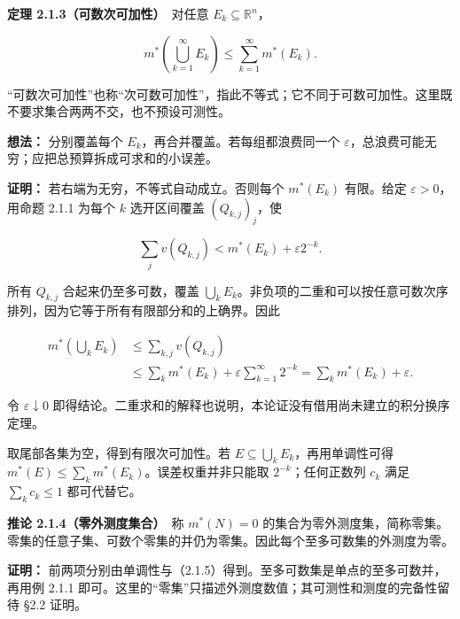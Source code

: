 \documentclass[11pt,a4paper]{article}
\begin{document}
\textbf{定理 2.1.3（可数次可加性）}　对任意
\(E_k\subseteq\mathbb R^n\)，

\begin{equation*}
m^*\left(\bigcup_{k=1}^{\infty}E_k\right)\le\sum_{k=1}^{\infty}m^*(E_k).
\tag{2.1.5}
\end{equation*}

``可数次可加性''也称``次可数可加性''，指此不等式；它不同于可数可加性。这里既不要求集合两两不交，也不预设可测性。

\textbf{想法：} 分别覆盖每个 \(E_k\)，再合并覆盖。若每组都浪费同一个
\(\varepsilon\)，总浪费可能无穷；应把总预算拆成可求和的小误差。

\textbf{证明：} 若右端为无穷，不等式自动成立。否则每个 \(m^*(E_k)\)
有限。给定 \(\varepsilon>0\)，用命题 2.1.1 为每个 \(k\) 选开区间覆盖
\((Q_{k,j})_j\)，使

\begin{equation*}
\sum_jv(Q_{k,j})<m^*(E_k)+\varepsilon 2^{-k}.
\tag{2.1.6}
\end{equation*}

所有 \(Q_{k,j}\) 合起来仍至多可数，覆盖
\(\bigcup_kE_k\)。非负项的二重和可以按任意可数次序排列，因为它等于所有有限部分和的上确界。因此

\begin{equation*}
\begin{aligned}
m^*\left(\bigcup_kE_k\right)
&\le\sum_{k,j}v(Q_{k,j})\\
&\le\sum_km^*(E_k)+\varepsilon\sum_{k=1}^{\infty}2^{-k}
=\sum_km^*(E_k)+\varepsilon.
\end{aligned}\tag{2.1.7}
\end{equation*}

令 \(\varepsilon\downarrow0\)
即得结论。二重求和的解释也说明，本论证没有借用尚未建立的积分换序定理。

取尾部各集为空，得到有限次可加性。若
\(E\subseteq\bigcup_kE_k\)，再用单调性可得
\(m^*(E)\le\sum_km^*(E_k)\)。误差权重并非只能取 \(2^{-k}\)；任何正数列
\(c_k\) 满足 \(\sum_kc_k\le1\) 都可代替它。

\textbf{推论 2.1.4（零外测度集合）}　称 \(m^*(N)=0\)
的集合为零外测度集，简称零集。零集的任意子集、可数个零集的并仍为零集。因此每个至多可数集的外测度为零。

\textbf{证明：}
前两项分别由单调性与（2.1.5）得到。至多可数集是单点的至多可数并，再用例
2.1.1 即可。这里的``零集''只描述外测度数值；其可测性和测度的完备性留待
§2.2 证明。
\end{document}
